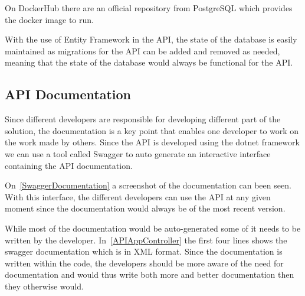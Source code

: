 On DockerHub there are an official repository from PostgreSQL which provides the docker image to run\cite{DockerHubPostgreSQL}.

With the use of Entity Framework in the API, the state of the database is easily maintained as migrations for the API can be added and removed as needed, meaning that the state of the database would always be functional for the API\cite{EntityFramework}.

\subsection{API Documentation}

Since different developers are responsible for developing different part of the solution, the documentation is a key point that enables one developer to work on the work made by others.
Since the API is developed using the dotnet framework we can use a tool called Swagger to auto generate an interactive interface containing the API documentation\cite{SwaggerIO}.

On~\autoref{SwaggerDocumentation} a screenshot of the documentation can been seen.
With this interface, the different developers can use the API at any given moment since the documentation would always be of the most recent version.


While most of the documentation would be auto-generated some of it needs to be written by the developer.
In~\autoref{APIAppController} the first four lines shows the swagger documentation which is in XML format.
Since the documentation is written within the code, the developers should be more aware of the need for documentation and would thus write both more and better documentation then they otherwise would.
